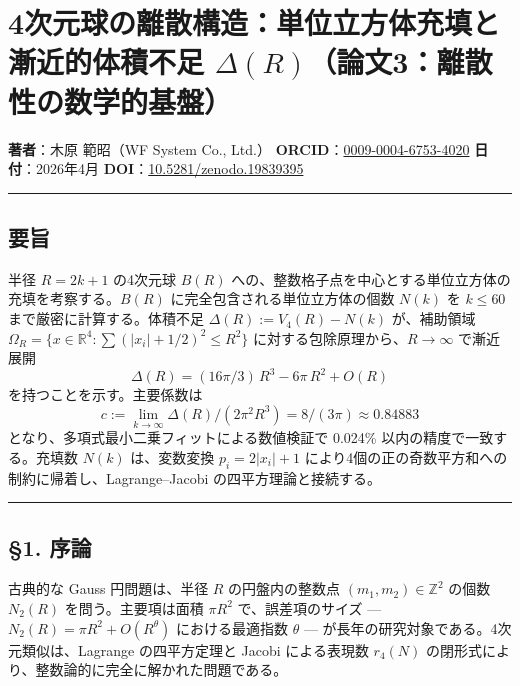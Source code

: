 \documentclass[a4paper,11pt]{ltjsarticle}
\theoremstyle{definition}
\begin{document}
\section{\texorpdfstring{4次元球の離散構造：単位立方体充填と漸近的体積不足
\(\Delta(R)\)（論文3：離散性の数学的基盤）}{4次元球の離散構造：単位立方体充填と漸近的体積不足 \textbackslash Delta(R)（論文3：離散性の数学的基盤）}}\label{ux6b21ux5143ux7403ux306eux96e2ux6563ux69cbux9020ux5358ux4f4dux7acbux65b9ux4f53ux5145ux586bux3068ux6f38ux8fd1ux7684ux4f53ux7a4dux4e0dux8db3-deltarux8ad6ux65873ux96e2ux6563ux6027ux306eux6570ux5b66ux7684ux57faux76e4}

\textbf{著者}：木原 範昭（WF System Co., Ltd.）
\textbf{ORCID}：\href{https://orcid.org/0009-0004-6753-4020}{0009-0004-6753-4020}
\textbf{日付}：2026年4月
\textbf{DOI}：\href{https://doi.org/10.5281/zenodo.19839395}{10.5281/zenodo.19839395}

\begin{center}\rule{0.5\linewidth}{0.5pt}\end{center}

\subsection{要旨}\label{ux8981ux65e8}

半径 \(R = 2k+1\) の4次元球 \(B(R)\)
への、整数格子点を中心とする単位立方体の充填を考察する。\(B(R)\)
に完全包含される単位立方体の個数 \(N(k)\) を \(k \le 60\)
まで厳密に計算する。体積不足 \(\Delta(R) := V_4(R) - N(k)\) が、補助領域
\(\Omega_R = \{x \in \mathbb{R}^4 : \sum (|x_i|+1/2)^2 \le R^2\}\)
に対する包除原理から、\(R \to \infty\) で漸近展開
\[\Delta(R) = (16\pi/3)\,R^3 - 6\pi\,R^2 + O(R)\]
を持つことを示す。主要係数は
\[c := \lim_{k\to\infty} \Delta(R)/(2\pi^2 R^3) = 8/(3\pi) \approx 0.84883\]
となり、多項式最小二乗フィットによる数値検証で 0.024\%
以内の精度で一致する。充填数 \(N(k)\) は、変数変換 \(p_i = 2|x_i|+1\)
により4個の正の奇数平方和への制約に帰着し、Lagrange--Jacobi
の四平方理論と接続する。

\begin{center}\rule{0.5\linewidth}{0.5pt}\end{center}

\subsection{§1. 序論}\label{ux5e8fux8ad6}

古典的な Gauss 円問題は、半径 \(R\) の円盤内の整数点
\((m_1, m_2) \in \mathbb{Z}^2\) の個数 \(N_2(R)\) を問う。主要項は面積
\(\pi R^2\) で、誤差項のサイズ --- \(N_2(R) = \pi R^2 + O(R^\theta)\)
における最適指数 \(\theta\) ---
が長年の研究対象である。4次元類似は、Lagrange の四平方定理と Jacobi
による表現数 \(r_4(N)\)
の閉形式により、整数論的に完全に解かれた問題である。
\end{document}
